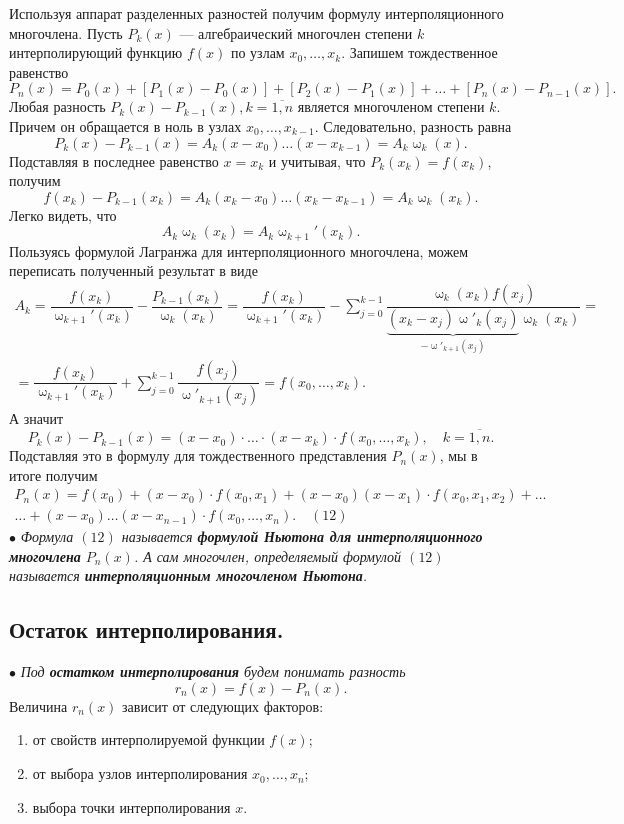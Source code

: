 \documentclass[a4paper, 12pt]{report}
\renewcommand{\omega}{\upomega}
\begin{document}
	Используя аппарат разделенных разностей получим формулу интерполяционного многочлена. Пусть $P_k(x)$ --- алгебраический многочлен степени $k$ интерполирующий функцию $f(x)$ по узлам $x_0,\ldots, x_k$. Запишем тождественное равенство $$P_n(x) = P_0(x) + [P_1(x) - P_0(x)] + [P_2(x) - P_1(x)] + \ldots + [P_n(x) - P_{n-1}(x)].$$
	Любая разность $P_k(x) - P_{k-1}(x), k=\overline{1,n}$ является многочленом степени $k$. Причем он обращается в ноль в узлах $x_0,\ldots, x_{k-1}$. Следовательно, разность равна $$P_k(x) - P_{k-1}(x) = A_k(x-x_0)\ldots (x-x_{k-1}) = A_k\omega_k(x).$$
	Подставляя в последнее равенство $x = x_k$ и учитывая, что $P_k(x_k) = f(x_k)$, получим $$f(x_k) - P_{k-1}(x_k) = A_k(x_k-x_0)\ldots(x_k - x_{k-1}) = A_k\omega_k (x_k).$$
	Легко видеть, что $$A_k\omega_k(x_k) = A_k\omega_{k+1}'(x_k).$$
	Пользуясь формулой Лагранжа для интерполяционного многочлена, можем переписать полученный результат в виде
	\begin{multline*}
		A_k = \dfrac{f(x_k)}{\omega_{k+1}'(x_k)} - \dfrac{P_{k-1}(x_k)}{\omega_k(x_k)}= \dfrac{f(x_k)}{\omega_{k+1}'(x_k)} - \sum_{j=0}^{k-1}\dfrac{\omega_k(x_k)f(x_j)}{\underbrace{(x_k - x_j)\omega'_k(x_j)}_{-\omega'_{k+1}(x_j)}\omega_k(x_k)}=\\=\dfrac{f(x_k)}{\omega_{k+1}'(x_k)} + \sum_{j=0}^{k-1}\dfrac{f(x_j)}{\omega'_{k+1}(x_j)} =f(x_0,\ldots, x_k).
	\end{multline*}
	А значит $$P_k(x) - P_{k-1}(x) = (x-x_0)\cdot \ldots \cdot (x-x_k)\cdot f(x_0,\ldots, x_k),\quad k=\overline{1,n}.$$
	Подставляя это в формулу для тождественного представления $P_n(x)$, мы в итоге получим
	\begin{multline*}
		P_n(x) = f(x_0) + (x-x_0)\cdot f(x_0, x_1) + (x-x_0)(x-x_1)\cdot f(x_0,x_1,x_2) +\ldots \\ \ldots + (x-x_0)\ldots (x-x_{n-1})\cdot f(x_0,\ldots, x_n).\quad(12)
	\end{multline*}
	$\bullet$ \textit{Формула $(12)$ называется \textbf{формулой Ньютона для интерполяционного многочлена} $P_n(x)$. А сам многочлен, определяемый формулой $(12)$ называется \textbf{интерполяционным многочленом Ньютона}.}
	\subsection{Остаток интерполирования.}
	$\bullet$ \textit{Под \textbf{остатком интерполирования} будем понимать разность} $$r_n(x) = f(x) - P_n(x).$$
	Величина $r_n(x)$ зависит от следующих факторов:
	\begin{enumerate}
		\item от свойств интерполируемой функции $f(x)$;
		\item от выбора узлов интерполирования $x_0,\ldots,x_n$;
		\item выбора точки интерполирования $x$.
	\end{enumerate}
\end{document}
